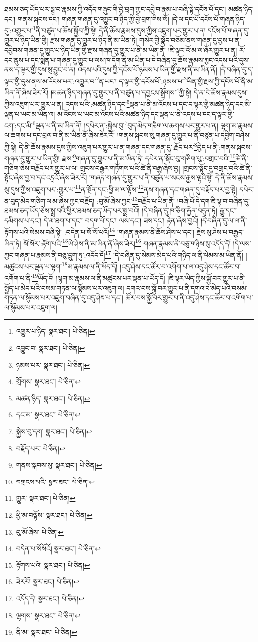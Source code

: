 ཐམས་ཅད་ཡོད་པར་སྨྲ་བ་རྣམས་ཀྱི་འདོད་གཞུང་གི་བྱེ་བྲག་ཀྱང་དབྱེ་བ་རྣམ་པ་བཞི་སྟེ་དངོས་པོ་དང་། མཚན་ཉིད་དང་། གནས་སྐབས་དང་། གཞན་གཞན་དུ་འགྱུར་བ་ཉིད་ཀྱི་བྱེ་བྲག་གིས་སོ། །དེ་ལ་དང་པོ་དངོས་པོ་གཞན་ཉིད་དུ་:འགྱུར་པ་\footnote{འགྱུར་པ་ཉིད་  སྣར་ཐང་།  པེ་ཅིན། }ནི་བཙུན་པ་ཆོས་སྐྱོབ་ཀྱི་སྟེ། དེ་ནི་ཆོས་རྣམས་དུས་ཀྱིས་འཇུག་པར་གྱུར་པ་ན། དངོས་པོ་གཞན་དུ་གྱུར་པ་ཉིད་ཡིན་གྱི། རྫས་གཞན་དུ་གྱུར་པ་ཉིད་ནི་མ་ཡིན་ཏེ། གསེར་གྱི་སྣོད་བཅོམ་ནས་གཞན་དུ་བྱས་པ་ན་དབྱིབས་གཞན་དུ་གྱུར་པ་ཉིད་ཡིན་གྱི་རྫས་གཞན་དུ་གྱུར་པ་ནི་མ་ཡིན་ནོ། །ཇི་ལྟར་འོ་མ་ལ་ཞོར་གྱུར་པ་ན། རོ་དང་ནུས་པ་དང་སྨིན་པ་གཞན་དུ་གྱུར་པ་ལས་ཁ་དོག་ནི་མ་ཡིན་པ་དེ་བཞིན་དུ་ཆོས་རྣམས་ཀྱང་འདས་པའི་དུས་ནས་ད་ལྟར་གྱི་དུས་སུ་བྱུང་བ་ན། འདས་པའི་དུས་ཀྱི་དངོས་པོ་ཉམས་པ་ཡིན་གྱི་རྫས་ནི་མ་ཡིན་ནོ། །དེ་བཞིན་དུ་ད་ལྟར་གྱི་དུས་ནས་མ་འོངས་པར་:འགྱུར་བ་\footnote{འབྱུང་བ་  སྣར་ཐང་།  པེ་ཅིན། }ན་ཡང་། ད་ལྟར་གྱི་དངོས་པོ་:ཉམས་པ་\footnote{ཉམས་པར་  སྣར་ཐང་།  པེ་ཅིན། }ཡིན་གྱི་རྫས་ཀྱི་དངོས་པོ་ནི་མ་ཡིན་ནོ་ཞེས་ཟེར་རོ། །མཚན་ཉིད་གཞན་དུ་གྱུར་པ་ནི་བཙུན་པ་དབྱངས་སྒྲོགས་\footnote{གྲོགས་  སྣར་ཐང་།  པེ་ཅིན། }ཀྱི་སྟེ། དེ་ན་རེ་ཆོས་རྣམས་དུས་ཀྱིས་འཇུག་པར་གྱུར་པ་ན། འདས་པའི་:མཚན་ཉིད་དང་\footnote{མཚན་ཉིད་  སྣར་ཐང་།  པེ་ཅིན། }ལྡན་པ་ནི་མ་འོངས་པ་དང་ད་ལྟར་གྱི་མཚན་ཉིད་དང་མི་ལྡན་པ་ཡང་མ་ཡིན་ལ། མ་འོངས་པ་ཡང་མ་འོངས་པའི་མཚན་ཉིད་དང་ལྡན་པ་ནི་འདས་པ་དང་ད་ལྟར་གྱི་ངག་:དང་མི་\footnote{དང་མ་  སྣར་ཐང་།  པེ་ཅིན། }ལྡན་པ་ནི་མ་ཡིན་ནོ། །དཔེར་ན་:སྐྱེས་བུ་\footnote{སྐྱེས་བུ་དག་  སྣར་ཐང་།  པེ་ཅིན། }བུད་མེད་གཅིག་ལ་ཆགས་པར་གྱུར་པ་ན། ལྷག་མ་རྣམས་ལ་ཆགས་པ་དང་བྲལ་བ་ནི་མ་ཡིན་ནོ་ཞེས་ཟེར་རོ། །གནས་སྐབས་སུ་གཞན་དུ་གྱུར་པ་ནི་བཙུན་པ་དབྱིག་བཤེས་ཀྱི་སྟེ། དེ་ནི་ཆོས་རྣམས་དུས་ཀྱིས་འཇུག་པར་གྱུར་པ་ན་གཞན་དང་གཞན་དུ་:རྗོད་པར་\footnote{བརྗོད་པར་  པེ་ཅིན། }བྱེད་པ་ནི་:གནས་སྐབས་གཞན་དུ་གྱུར་པ་ཡིན་གྱི། རྫས་\footnote{གནས་སྐབས་སུ་  སྣར་ཐང་།  པེ་ཅིན། }གཞན་དུ་གྱུར་པ་ནི་མ་ཡིན་ཏེ། དཔེར་ན་སྡོང་བུ་གཅིག་པུ་:བགྲང་བའི་\footnote{བགྲངས་པའི་  སྣར་ཐང་།  པེ་ཅིན། }ཚེ་ནི་གཅིག་ཅེས་བརྗོད་པར་གྱུར་པ་ལ། གྲངས་བརྒྱར་གཏོགས་པའི་ཚེ་ནི་བརྒྱ་ཞེས་བྱ། །གྲངས་སྟོང་དུ་བགྲང་བའི་ཚེ་ནི་སྟོང་ཞེས་བྱ་བ་དང་འདྲའོ་ཞེས་ཟེར་རོ། །གཞན་གཞན་དུ་གྱུར་པ་ནི་བཙུན་པ་སངས་རྒྱས་ལྷའི་སྟེ། དེ་ནི་ཆོས་རྣམས་སུ་དུས་ཀྱིས་འཇུག་པར་:གྱུར་པ་\footnote{གྱུར་  སྣར་ཐང་།  པེ་ཅིན། }ན་སྔོན་དང་:ཕྱི་མ་ལ་ལྟོས་\footnote{ཕྱི་མ་བལྟོས་  སྣར་ཐང་།  པེ་ཅིན། }ནས་གཞན་དང་གཞན་དུ་བརྗོད་པར་བྱ་སྟེ། དཔེར་ན་བུད་མེད་གཅིག་ལ་མ་ཞེས་ཀྱང་བརྗོད། :བུ་མོ་ཞེས་ཀྱང་\footnote{བུ་མོ་ཞེས་  པེ་ཅིན། }བརྗོད་པ་ཡིན་ནོ། །བཞི་པོ་དེ་དག་ཇི་ལྟ་བ་བཞིན་དུ་ཐམས་ཅད་ཡོད་ཅེས་སྨྲ་བའི་ཕྱིར་ཐམས་ཅད་ཡོད་པར་སྨྲ་བའོ། །དེ་བཞིན་དུ་ཁ་ཅིག་རྐྱེན་བདུན་ཏེ། རྒྱུ་དང་། དམིགས་པ་དང་། དེ་མ་ཐག་པ་དང་། བདག་པོ་དང་། ལས་དང་། ཟས་དང་། རྟེན་ཞེས་བྱའོ། །དེ་བཞིན་དུ་ལ་ལ་ནི་རྟོགས་པའི་སེམས་བཞི་སྟེ། :བདེན་པ་སོ་སོ་པའོ།\footnote{བདེན་པ་སོསོའོ།  སྣར་ཐང་།  པེ་ཅིན། } །གཞན་རྣམས་ནི་ཆོས་ཤེས་པ་དང་། རྗེས་སུ་ཤེས་པ་བརྒྱད་ཡིན་ཏེ། སོ་སོར་:རྟོག་པའི་\footnote{རྟོགས་པའི་  སྣར་ཐང་།  པེ་ཅིན། }ཡེ་ཤེས་ནི་མ་ཡིན་ནོ་ཞེས་ཟེར།\footnote{ཟེརརོ།  སྣར་ཐང་།  པེ་ཅིན། } གཞན་རྣམས་ནི་བཅུ་གཉིས་སུ་འདོད་དོ། །དེ་ལས་ཀྱང་གཞན་པ་རྣམས་ནི་བཅུ་དྲུག་ཏུ་:འདོད་དོ།\footnote{འདོད་དེ།  སྣར་ཐང་།  པེ་ཅིན། } །དེ་བཞིན་དུ་སེམས་མེད་པའི་གཉིད་ལ་ནི་སེམས་མ་ཡིན་ནོ། །མཚུངས་པར་ལྡན་པ་ལྷག་\footnote{ལྷགས་  སྣར་ཐང་།  པེ་ཅིན། }མ་རྣམས་ལ་ནི་ཡོད་དོ། །འདུ་ཤེས་དང་ཚོར་བ་འགོག་པ་ལ་འདུ་ཤེས་དང་ཚོར་བ་འགོག་པ་ནི་\footnote{ནི་མ་  སྣར་ཐང་།  པེ་ཅིན། }ཡོད་དོ། །ལྷག་མ་རྣམས་ལ་ནི་མཚུངས་པར་ལྡན་པ་ཡོད་དོ། །ཇི་ལྟར་ཡིད་ཀྱིས་སྐྱོ་བར་གྱུར་པ་ནི་སྤྱོད་པ་མེད་པའི་བསམ་གཏན་ལ་སྙོམས་པར་འཇུག་ལ། དགའ་བས་སྐྱོ་བར་གྱུར་པ་ནི་དགའ་བ་མེད་པའི་བསམ་གཏན་ལ་སྙོམས་པར་འཇུག་བཞིན་དུ་འདུ་ཤེས་པ་དང་། ཚོར་བས་སྐྱོ་བར་གྱུར་པ་ནི་འདུ་ཤེས་དང་ཚོར་བ་འགོག་པ་ལ་སྙོམས་པར་འཇུག་ལ། 